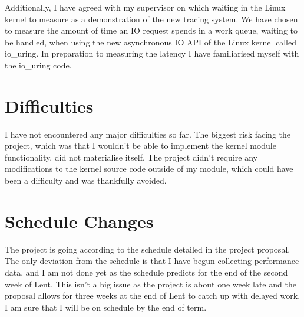 \documentclass[12pt, A4]{article}
\begin{document}
        Additionally, I have agreed with my supervisor on which waiting in the Linux kernel to measure as a demonstration of the new tracing system. We have chosen to measure the amount of time an IO request spends in a work queue, waiting to be handled, when using the new asynchronous IO API of the Linux kernel called io\_uring. In preparation to measuring the latency I have familiarised myself with the io\_uring code.

    \section{Difficulties}
        I have not encountered any major difficulties so far. The biggest risk facing the project, which was that I wouldn't be able to implement the kernel module functionality, did not materialise itself. The project didn't require any modifications to the kernel source code outside of my module, which could have been a difficulty and was thankfully avoided.

    \section{Schedule Changes}
        The project is going according to the schedule detailed in the project proposal. The only deviation from the schedule is that I have begun collecting performance data, and I am not done yet as the schedule predicts for the end of the second week of Lent. This isn't a big issue as the project is about one week late and the proposal allows for three weeks at the end of Lent to catch up with delayed work. I am sure that I will be on schedule by the end of term.  
\end{document}
